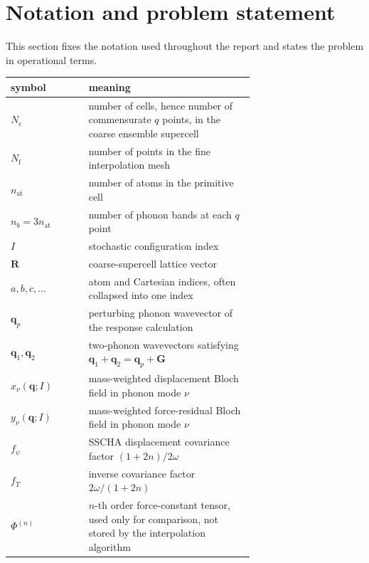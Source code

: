 \documentclass[11pt,a4paper]{article}
\newcommand{\qv}{\mathbf{q}}
\newcommand{\Rv}{\mathbf{R}}
\newcommand{\Nc}{N_{\mathrm{c}}}
\newcommand{\Nf}{N_{\mathrm{f}}}
\newcommand{\fY}{f_{\Upsilon}}
\newcommand{\fpsi}{f_{\psi}}
\newcommand{\nat}{n_{\mathrm{at}}}
\newcommand{\nb}{n_b}
\begin{document}
\tableofcontents

\section{Notation and problem statement}
\label{sec:notation}

This section fixes the notation used throughout the report and states the
problem in operational terms.

\begin{center}
\begin{tabular}{lp{0.68\linewidth}}
\toprule
symbol & meaning \\
\midrule
$\Nc$ & number of cells, hence number of commensurate $q$ points, in the
coarse ensemble supercell \\
$\Nf$ & number of points in the fine interpolation mesh \\
$\nat$ & number of atoms in the primitive cell \\
$\nb=3\nat$ & number of phonon bands at each $q$ point \\
$I$ & stochastic configuration index \\
$\Rv$ & coarse-supercell lattice vector \\
$a,b,c,\ldots$ & atom and Cartesian indices, often collapsed into one index \\
$\qv_p$ & perturbing phonon wavevector of the response calculation \\
$\qv_1,\qv_2$ & two-phonon wavevectors satisfying $\qv_1+\qv_2=\qv_p+\mathbf G$ \\
$x_\nu(\qv;I)$ & mass-weighted displacement Bloch field in phonon mode $\nu$ \\
$y_\nu(\qv;I)$ & mass-weighted force-residual Bloch field in phonon mode $\nu$ \\
$\fpsi$ & SSCHA displacement covariance factor $(1+2n)/2\omega$ \\
$\fY$ & inverse covariance factor $2\omega/(1+2n)$ \\
$\Phi^{(n)}$ & $n$-th order force-constant tensor, used only for comparison,
not stored by the interpolation algorithm \\
\bottomrule
\end{tabular}
\end{center}
\end{document}
